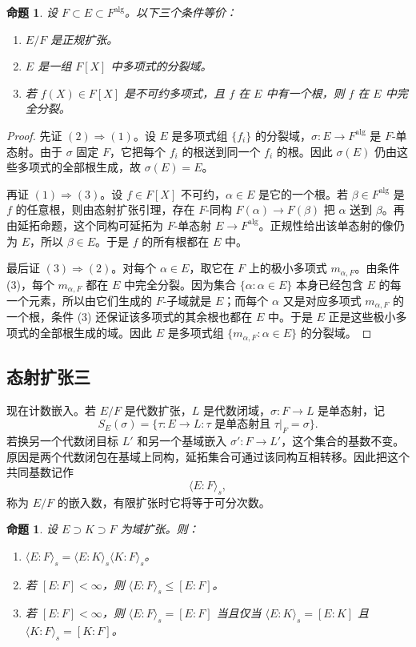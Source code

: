 \documentclass[11pt,a4paper,openany]{ctexbook}
\numberwithin{equation}{chapter}
\theoremstyle{plain}
\newtheorem{proposition}[theorem]{命题}
\theoremstyle{definition}
\theoremstyle{remark}
\begin{document}
\begin{proposition}
设 $F\subset E\subset F^{\mathrm{alg}}$。以下三个条件等价：
\begin{enumerate}[label=(\arabic*)]
\item $E/F$ 是正规扩张。
\item $E$ 是一组 $F[X]$ 中多项式的分裂域。
\item 若 $f(X)\in F[X]$ 是不可约多项式，且 $f$ 在 $E$ 中有一个根，则 $f$ 在 $E$ 中完全分裂。
\end{enumerate}
\end{proposition}

\begin{proof}
先证 $(2)\Rightarrow(1)$。设 $E$ 是多项式组 $\{f_i\}$ 的分裂域，$\sigma:E\to F^{\mathrm{alg}}$ 是 $F$-单态射。由于 $\sigma$ 固定 $F$，它把每个 $f_i$ 的根送到同一个 $f_i$ 的根。因此 $\sigma(E)$ 仍由这些多项式的全部根生成，故 $\sigma(E)=E$。

再证 $(1)\Rightarrow(3)$。设 $f\in F[X]$ 不可约，$\alpha\in E$ 是它的一个根。若 $\beta\in F^{\mathrm{alg}}$ 是 $f$ 的任意根，则由态射扩张引理，存在 $F$-同构 $F(\alpha)\to F(\beta)$ 把 $\alpha$ 送到 $\beta$。再由延拓命题，这个同构可延拓为 $F$-单态射 $E\to F^{\mathrm{alg}}$。正规性给出该单态射的像仍为 $E$，所以 $\beta\in E$。于是 $f$ 的所有根都在 $E$ 中。

最后证 $(3)\Rightarrow(2)$。对每个 $\alpha\in E$，取它在 $F$ 上的极小多项式 $m_{\alpha,F}$。由条件 (3)，每个 $m_{\alpha,F}$ 都在 $E$ 中完全分裂。因为集合 $\{\alpha:\alpha\in E\}$ 本身已经包含 $E$ 的每一个元素，所以由它们生成的 $F$-子域就是 $E$；而每个 $\alpha$ 又是对应多项式 $m_{\alpha,F}$ 的一个根，条件 (3) 还保证该多项式的其余根也都在 $E$ 中。于是 $E$ 正是这些极小多项式的全部根生成的域。因此 $E$ 是多项式组 $\{m_{\alpha,F}:\alpha\in E\}$ 的分裂域。
\end{proof}

\subsection{态射扩张三}

现在计数嵌入。若 $E/F$ 是代数扩张，$L$ 是代数闭域，$\sigma:F\to L$ 是单态射，记
\[
S_E(\sigma)=\{\tau:E\to L:\tau\text{ 是单态射且 }\tau|_F=\sigma\}.
\]
若换另一个代数闭目标 $L'$ 和另一个基域嵌入 $\sigma':F\to L'$，这个集合的基数不变。原因是两个代数闭包在基域上同构，延拓集合可通过该同构互相转移。因此把这个共同基数记作
\[
\langle E:F\rangle_s,
\]
称为 $E/F$ 的嵌入数，有限扩张时它将等于可分次数。

\begin{proposition}
设 $E\supset K\supset F$ 为域扩张。则：
\begin{enumerate}[label=(\arabic*)]
\item $\langle E:F\rangle_s=\langle E:K\rangle_s\langle K:F\rangle_s$。
\item 若 $[E:F]<\infty$，则 $\langle E:F\rangle_s\le [E:F]$。
\item 若 $[E:F]<\infty$，则 $\langle E:F\rangle_s=[E:F]$ 当且仅当 $\langle E:K\rangle_s=[E:K]$ 且 $\langle K:F\rangle_s=[K:F]$。
\end{enumerate}
\end{proposition}
\end{document}
